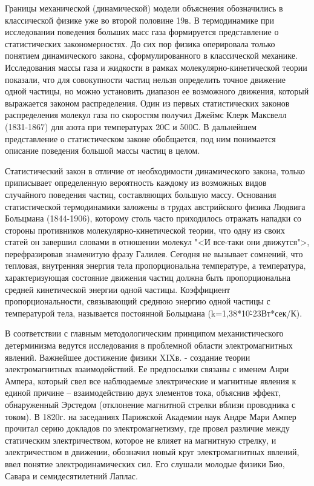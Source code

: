 \documentclass[exam_answers.tex]{subfiles}
\begin{document}
Границы механической (динамической) модели объяснения обозначились
в классической физике уже во второй половине 19в. В термодинамике при
исследовании поведения больших масс газа формируется представление о
статистических закономерностях. До сих пор физика оперировала только
понятием динамического закона, сформулированного в классической механике.
Исследования массы газа и жидкости в рамках молекулярно-кинетической
теории показали, что для совокупности частиц нельзя определить точное
движение одной частицы, но можно установить диапазон ее возможного
движения, который выражается законом распределения. Один из первых
статистических законов распределения молекул газа по скоростям получил
Джеймс Клерк Максвелл (1831-1867) для азота при температурах 20С и 500С. В 
дальнейшем представление о статистическом законе обобщается, под ним
понимается описание поведения большой массы частиц в целом.

Статистический закон в отличие от необходимости динамического
закона, только приписывает определенную вероятность каждому из возможных
видов случайного поведения частиц, составляющих большую массу.
Основания статистической термодинамики заложены в трудах
австрийского физика Людвига Больцмана (1844-1906), которому столь часто
приходилось отражать нападки со стороны противников молекулярно-кинетической теории, что одну из своих статей он завершил словами в
отношении молекул "<И все-таки они движутся">, перефразировав знаменитую
фразу Галилея. Сегодня не вызывает сомнений, что тепловая, внутренняя
энергия тела пропорциональна температуре, а температура, характеризующая
состояние движения частиц должна быть пропорциональна средней
кинетической энергии одной частицы. Коэффициент пропорциональности,
связывающий среднюю энергию одной частицы с температурой тела,
называется постоянной Больцмана (k=1,38*10\^{-23}Вт*сек/К). 

В соответствии с главным методологическим принципом
механистического детерминизма ведутся исследования в проблемной области
электромагнитных явлений. Важнейшее достижение физики XIXв. - создание
теории электромагнитных взаимодействий. Ее предпосылки связаны с именем
Анри Ампера, который свел все наблюдаемые электрические и магнитные
явления к единой причине – взаимодействию двух элементов тока, объяснив
эффект, обнаруженный Эрстедом (отклонение магнитной стрелки вблизи
проводника с током). В 1820г. на заседаниях Парижской Академии наук Андре
Мари Ампер прочитал серию докладов по электромагнетизму, где провел
различие между статическим электричеством, которое не влияет на магнитную
стрелку, и электричеством в движении, обозначил новый круг
электромагнитных явлений, ввел понятие электродинамических сил. Его
слушали молодые физики Био, Савара и семидесятилетний Лаплас. 
\end{document}
